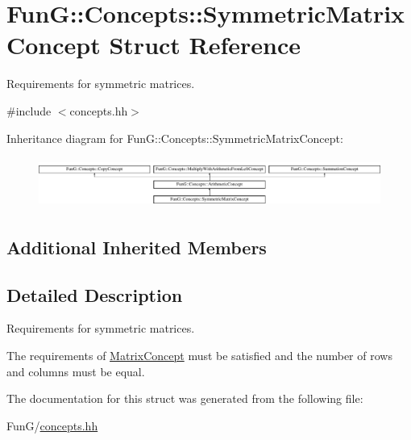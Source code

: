 \hypertarget{structFunG_1_1Concepts_1_1SymmetricMatrixConcept}{\section{Fun\-G\-:\-:Concepts\-:\-:Symmetric\-Matrix\-Concept Struct Reference}
\label{structFunG_1_1Concepts_1_1SymmetricMatrixConcept}
}


Requirements for symmetric matrices.  




{\ttfamily \#include $<$concepts.\-hh$>$}

Inheritance diagram for Fun\-G\-:\-:Concepts\-:\-:Symmetric\-Matrix\-Concept\-:\begin{figure}[H]
\begin{center}
\leavevmode
\includegraphics[height=1.661721cm]{structFunG_1_1Concepts_1_1SymmetricMatrixConcept}
\end{center}
\end{figure}
\subsection*{Additional Inherited Members}


\subsection{Detailed Description}
Requirements for symmetric matrices. 

The requirements of \hyperlink{structFunG_1_1Concepts_1_1MatrixConcept}{Matrix\-Concept} must be satisfied and the number of rows and columns must be equal. 

The documentation for this struct was generated from the following file\-:\begin{DoxyCompactItemize}
\item 
Fun\-G/\hyperlink{concepts_8hh}{concepts.\-hh}\end{DoxyCompactItemize}

